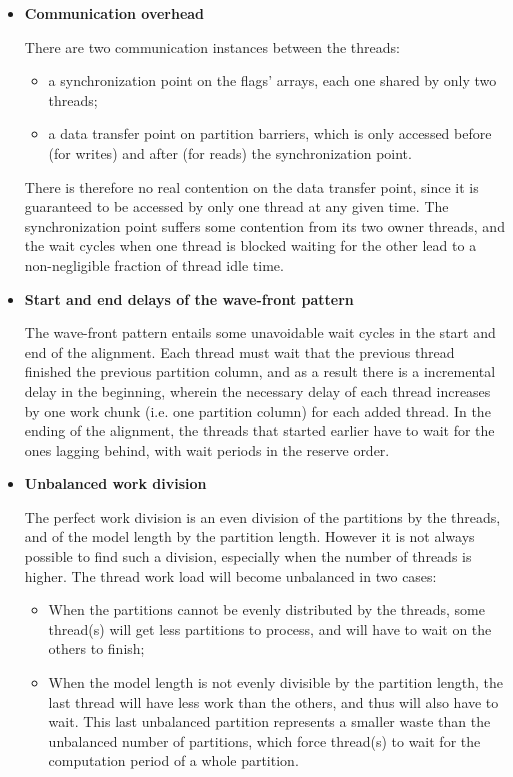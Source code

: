 \begin{itemize}

\item \textbf{Communication overhead}

There are two communication instances between the threads: 
\begin{itemize}[nolistsep]
\item a synchronization point on the flags' arrays, each one shared by only two threads;
\item a data transfer point on partition barriers, which is only accessed before (for writes) and after (for reads) the synchronization point.
\end{itemize}

There is therefore no real contention on the data transfer point, since it is guaranteed to be accessed by only one thread at any given time. The synchronization point suffers some contention from its two owner threads, and the wait cycles when one thread is blocked waiting for the other lead to a non-negligible fraction of thread idle time.


\item \textbf{Start and end delays of the wave-front pattern}

The wave-front pattern entails some unavoidable wait cycles in the start and end of the alignment. Each thread must wait that the previous thread finished the previous partition column, and as a result there is a incremental delay in the beginning, wherein the necessary delay of each thread increases by one work chunk (i.e. one partition column) for each added thread. In the ending of the alignment, the threads that started earlier have to wait for the ones lagging behind, with wait periods in the reserve order.


\item \textbf{Unbalanced work division}

The perfect work division is an even division of the partitions by the threads, and of the model length by the partition length. However it is not always possible to find such a division, especially when the number of threads is higher. The thread work load will become unbalanced in two cases:
\begin{itemize}[nolistsep]
\item When the partitions cannot be evenly distributed by the threads, some thread(s) will get less partitions to process, and will have to wait on the others to finish;
\item When the model length is not evenly divisible by the partition length, the last thread will have less work than the others, and thus will also have to wait. This last unbalanced partition represents a smaller waste than the unbalanced number of partitions, which force thread(s) to wait for the computation period of a whole partition.
\end{itemize}


\end{itemize}
